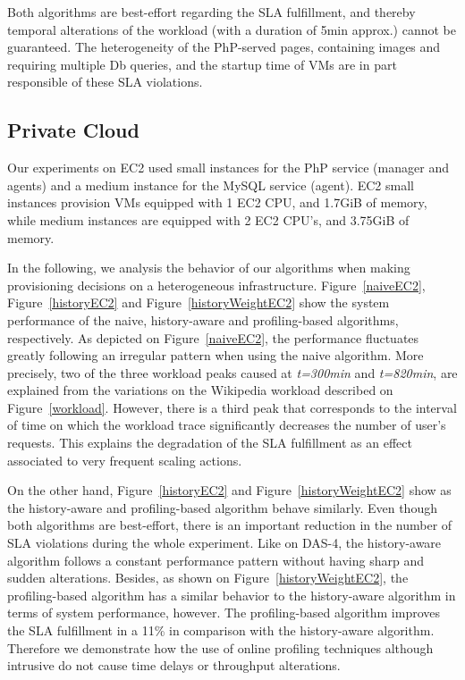 Both algorithms are best-effort regarding the SLA fulfillment, and thereby temporal alterations of the workload (with a duration of 5min approx.) cannot be guaranteed. The heterogeneity of the PhP-served pages, containing images and requiring multiple Db queries, and the startup time of VMs are in part responsible of these SLA violations. 




\subsection{Private Cloud}

Our experiments on EC2 used small instances for the PhP service (manager and agents) and  a medium instance for the MySQL service (agent). EC2 small instances provision VMs equipped with 1 EC2 CPU, and 1.7GiB of memory, while medium instances are equipped with 2 EC2 CPU's, and 3.75GiB of memory.

In the following, we analysis the behavior of our algorithms when making provisioning decisions on a heterogeneous infrastructure. Figure~\ref{naiveEC2}, Figure~\ref{historyEC2} and Figure~\ref{historyWeightEC2} show the system performance of the naive, history-aware and profiling-based algorithms, respectively. As depicted on Figure~\ref{naiveEC2}, the performance fluctuates greatly following an irregular pattern when using the naive algorithm. More precisely, two of the three workload peaks caused at \emph{t=300min} and \emph{t=820min}, are explained from the variations on the Wikipedia workload described on Figure~\ref{workload}. However, there is a third peak that corresponds to the interval of time on which the workload trace significantly decreases the number of user's requests. This explains the degradation of the SLA fulfillment as an effect associated to very frequent scaling actions. 

On the other hand, Figure~\ref{historyEC2} and Figure~\ref{historyWeightEC2} show as the history-aware and profiling-based algorithm behave similarly. Even though both algorithms are best-effort, there is an important reduction in the number of SLA violations during the whole experiment. Like on DAS-4, the history-aware algorithm follows a constant performance pattern without having sharp and sudden alterations. Besides, as shown on Figure~\ref{historyWeightEC2}, the profiling-based algorithm has a similar behavior to the history-aware algorithm in terms of system performance, however. The profiling-based algorithm improves the SLA fulfillment in a 11\% in comparison with the history-aware algorithm. Therefore we demonstrate how the use of online profiling techniques although intrusive do not cause time delays or throughput alterations. 

